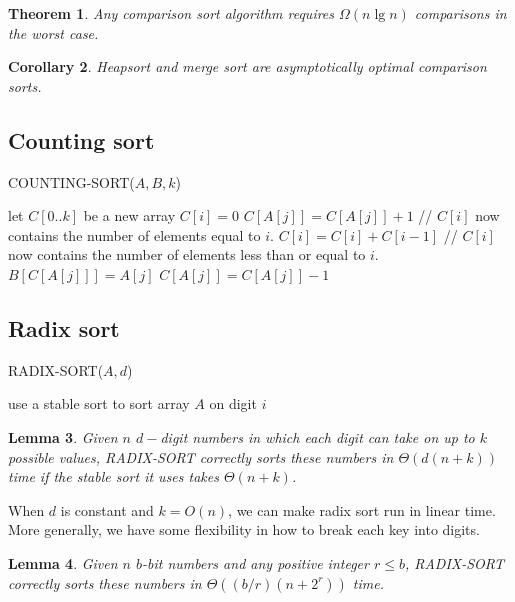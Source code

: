 \documentclass[12pt]{article}
\newtheorem{theorem}{Theorem}
\newtheorem{lemma}[theorem]{Lemma}
\newtheorem{corollary}[theorem]{Corollary}
\begin{document}
\begin{theorem}
  Any comparison sort algorithm requires $\Omega (n \lg n)$ comparisons in the worst case.
\end{theorem}

\begin{corollary}
  Heapsort and merge sort are asymptotically optimal comparison sorts.
\end{corollary}

\subsection{Counting sort}

COUNTING-SORT($A, B, k$)
\begin{algorithmic}[1]
\State let $C[0..k]$ be a new array
	\State $C[i] = 0$
\EndFor
{}
	\State $C[A[j]] = C[A[j]] + 1$
\EndFor
\State // $C[i]$ now contains the number of elements equal to $i$.
	\State $C[i] = C[i] + C[i-1]$
\EndFor
\State // $C[i]$ now contains the number of elements less than or equal to $i$.
	\State $B[C[A[j]]] = A[j]$
        \State $C[A[j]] = C[A[j]] - 1$
\EndFor
\end{algorithmic}

\subsection{Radix sort}

RADIX-SORT($A, d$)
\begin{algorithmic}[1]
	\State use a stable sort to sort array $A$ on digit $i$
\EndFor
\end{algorithmic}

\begin{lemma}
  Given $n$ $d-$digit numbers in which each digit can take on up to $k$ possible values, RADIX-SORT correctly sorts these numbers in $\Theta(d(n+k))$ time if the stable sort it uses takes $\Theta (n+k)$.
\end{lemma}

When $d$ is constant and $k = O(n)$, we can make radix sort run in linear time. More generally, we have some flexibility in how to break each key into digits.

\begin{lemma}
  Given $n$ $b$-bit numbers and any positive integer $r \le b$, RADIX-SORT correctly sorts these numbers in $\Theta ((b/r)(n + 2^r))$ time.
\end{lemma}
\end{document}

